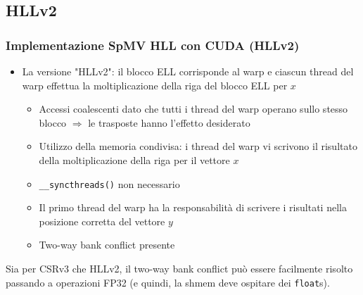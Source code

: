 \documentclass{beamer}
\begin{document}
\subsection{HLLv2}
\begin{frame}
    \frametitle{Implementazione SpMV HLL con CUDA (HLLv2)}
    
    \begin{itemize}
    	
    	\item La versione "HLLv2": il blocco ELL corrisponde al warp e ciascun thread del warp
    	effettua la moltiplicazione della riga del blocco ELL per $x$
    	
    	\begin{itemize}
    		\item Accessi coalescenti dato che tutti i thread del warp operano sullo stesso blocco
    		$\Rightarrow$ le trasposte hanno l'effetto desiderato
    		
    		\item Utilizzo della memoria condivisa: i thread del warp vi scrivono il risultato
    		della moltiplicazione della riga per il vettore $x$
    		
    		\item \texttt{\_\_syncthreads()} non necessario
    		\item Il primo thread del warp ha la responsabilità di scrivere i risultati
    		nella posizione corretta del vettore $y$
    		
    		\item Two-way bank conflict presente
    	\end{itemize}
    	
    \end{itemize}
    
    Sia per CSRv3 che HLLv2, il two-way bank conflict può essere facilmente risolto passando
    a operazioni FP32 (e quindi, la shmem deve ospitare dei \texttt{float}s).
    
\end{frame}
\end{document}
